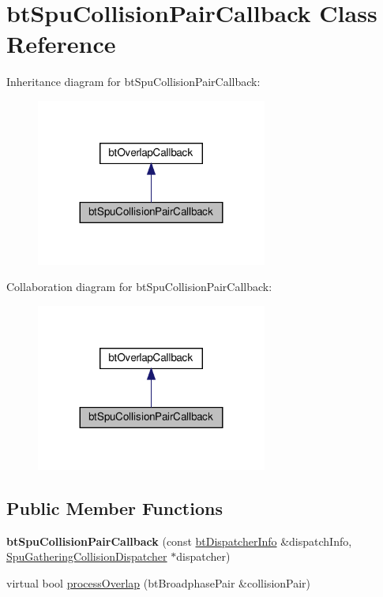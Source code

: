 \hypertarget{classbtSpuCollisionPairCallback}{}\section{bt\+Spu\+Collision\+Pair\+Callback Class Reference}
\label{classbtSpuCollisionPairCallback}


Inheritance diagram for bt\+Spu\+Collision\+Pair\+Callback\+:
\nopagebreak
\begin{figure}[H]
\begin{center}
\leavevmode
\includegraphics[width=215pt]{classbtSpuCollisionPairCallback__inherit__graph}
\end{center}
\end{figure}


Collaboration diagram for bt\+Spu\+Collision\+Pair\+Callback\+:
\nopagebreak
\begin{figure}[H]
\begin{center}
\leavevmode
\includegraphics[width=215pt]{classbtSpuCollisionPairCallback__coll__graph}
\end{center}
\end{figure}
\subsection*{Public Member Functions}
\begin{DoxyCompactItemize}
\item 
\mbox{\label{classbtSpuCollisionPairCallback_a548a2b6d1f3ca76458f6343c69b9fae9}} 
{\bfseries bt\+Spu\+Collision\+Pair\+Callback} (const \hyperlink{structbtDispatcherInfo}{bt\+Dispatcher\+Info} \&dispatch\+Info, \hyperlink{classSpuGatheringCollisionDispatcher}{Spu\+Gathering\+Collision\+Dispatcher} $\ast$dispatcher)
\item 
virtual bool \hyperlink{classbtSpuCollisionPairCallback_ae832c301c592c9fa65bc17e10cc3e3c2}{process\+Overlap} (bt\+Broadphase\+Pair \&collision\+Pair)
\end{DoxyCompactItemize}


